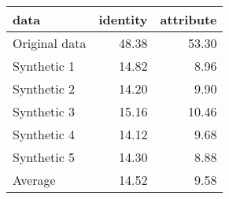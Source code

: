 \begin{tabular}{lrr}
  \toprule
data & identity & attribute \\ 
  \midrule
Original data & 48.38 & 53.30 \\ 
  Synthetic 1 & 14.82 & 8.96 \\ 
  Synthetic 2 & 14.20 & 9.90 \\ 
  Synthetic 3 & 15.16 & 10.46 \\ 
  Synthetic 4 & 14.12 & 9.68 \\ 
  Synthetic 5 & 14.30 & 8.88 \\ 
  Average & 14.52 & 9.58 \\ 
   \bottomrule
\end{tabular}
